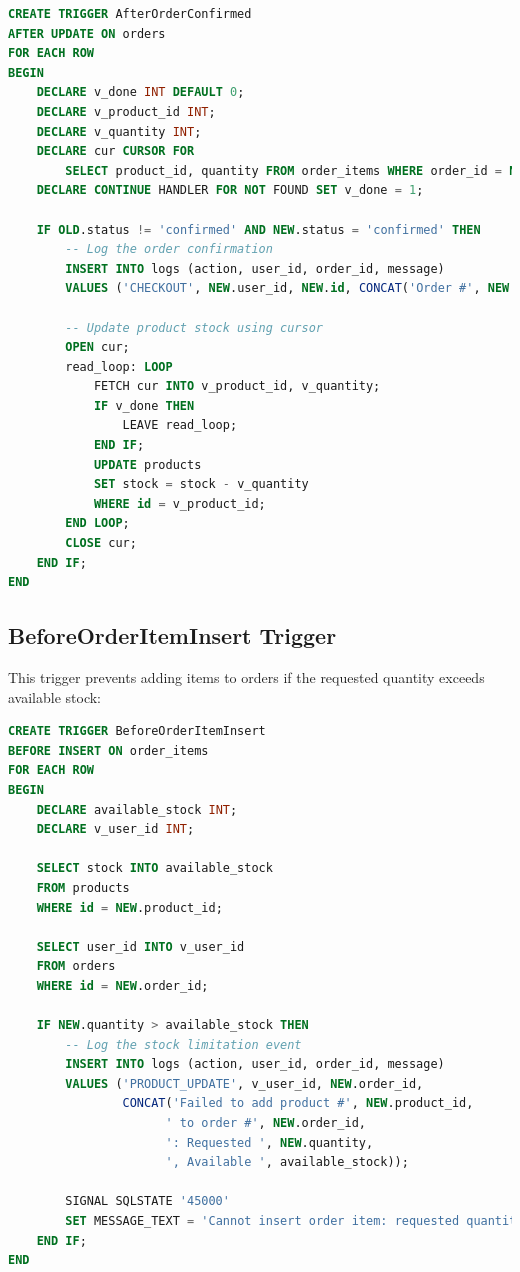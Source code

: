 \documentclass{article}
\begin{document}
\begin{lstlisting}[language=SQL]
CREATE TRIGGER AfterOrderConfirmed
AFTER UPDATE ON orders
FOR EACH ROW
BEGIN
    DECLARE v_done INT DEFAULT 0;
    DECLARE v_product_id INT;
    DECLARE v_quantity INT;
    DECLARE cur CURSOR FOR 
        SELECT product_id, quantity FROM order_items WHERE order_id = NEW.id;
    DECLARE CONTINUE HANDLER FOR NOT FOUND SET v_done = 1;

    IF OLD.status != 'confirmed' AND NEW.status = 'confirmed' THEN
        -- Log the order confirmation
        INSERT INTO logs (action, user_id, order_id, message)
        VALUES ('CHECKOUT', NEW.user_id, NEW.id, CONCAT('Order #', NEW.id, ' confirmed'));

        -- Update product stock using cursor
        OPEN cur;
        read_loop: LOOP
            FETCH cur INTO v_product_id, v_quantity;
            IF v_done THEN
                LEAVE read_loop;
            END IF;
            UPDATE products
            SET stock = stock - v_quantity
            WHERE id = v_product_id;
        END LOOP;
        CLOSE cur;
    END IF;
END
\end{lstlisting}

\subsection{BeforeOrderItemInsert Trigger}
This trigger prevents adding items to orders if the requested quantity exceeds available stock:

\begin{lstlisting}[language=SQL]
CREATE TRIGGER BeforeOrderItemInsert
BEFORE INSERT ON order_items
FOR EACH ROW
BEGIN
    DECLARE available_stock INT;
    DECLARE v_user_id INT;
    
    SELECT stock INTO available_stock
    FROM products
    WHERE id = NEW.product_id;
    
    SELECT user_id INTO v_user_id
    FROM orders
    WHERE id = NEW.order_id;

    IF NEW.quantity > available_stock THEN
        -- Log the stock limitation event
        INSERT INTO logs (action, user_id, order_id, message)
        VALUES ('PRODUCT_UPDATE', v_user_id, NEW.order_id, 
                CONCAT('Failed to add product #', NEW.product_id, 
                      ' to order #', NEW.order_id, 
                      ': Requested ', NEW.quantity, 
                      ', Available ', available_stock));
                
        SIGNAL SQLSTATE '45000'
        SET MESSAGE_TEXT = 'Cannot insert order item: requested quantity exceeds available stock';
    END IF;
END
\end{lstlisting}
\end{document}
